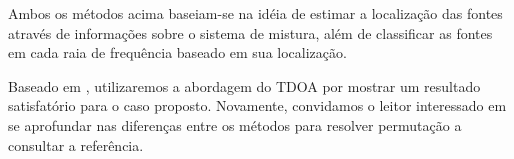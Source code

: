     Ambos os métodos acima baseiam-se na idéia de estimar a localização das fontes através de informações sobre o sistema de mistura, além de classificar as fontes em cada raia de frequência baseado em sua localização.
    
    Baseado em \cite{LuizVictorio}, utilizaremos a abordagem do TDOA por mostrar um resultado satisfatório para o caso proposto. Novamente, convidamos o leitor interessado em se aprofundar nas diferenças entre os métodos para resolver permutação a consultar a referência.
